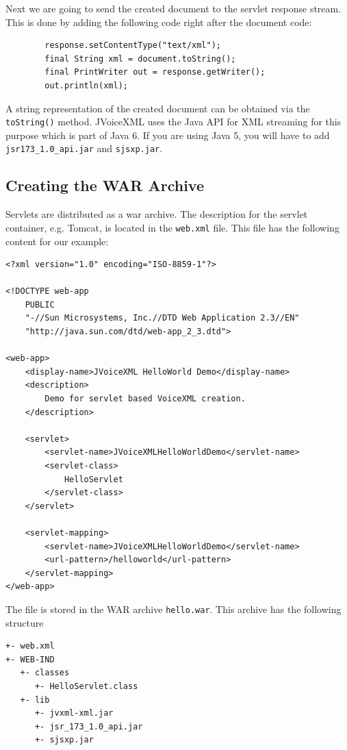 \documentclass[11pt,a4paper]{article}
\begin{document}
Next we are going to send the created document to the servlet response stream.
This is done by adding the following code right after the document code:

\begin{lstlisting}
        response.setContentType("text/xml");
        final String xml = document.toString();
        final PrintWriter out = response.getWriter();
        out.println(xml);
\end{lstlisting}

A string representation of the created document can be obtained via the
\texttt{toString()} method. JVoiceXML uses the Java API for XML streaming for
this purpose which is part of Java 6. If you are using Java 5, you will have to
add \texttt{jsr173\_1.0\_api.jar} and \texttt{sjsxp.jar}.

\subsection{Creating the WAR Archive}

Servlets are distributed as a war archive. The description for the servlet
container, e.g. Tomcat, is located in the \texttt{web.xml} file.
This file has the following content for our example:

\begin{lstlisting}
<?xml version="1.0" encoding="ISO-8859-1"?>

<!DOCTYPE web-app
    PUBLIC
    "-//Sun Microsystems, Inc.//DTD Web Application 2.3//EN"
    "http://java.sun.com/dtd/web-app_2_3.dtd">

<web-app>
    <display-name>JVoiceXML HelloWorld Demo</display-name>
    <description>
        Demo for servlet based VoiceXML creation.
    </description>

    <servlet>
        <servlet-name>JVoiceXMLHelloWorldDemo</servlet-name>
        <servlet-class>
            HelloServlet
        </servlet-class>
    </servlet>

    <servlet-mapping>
        <servlet-name>JVoiceXMLHelloWorldDemo</servlet-name>
        <url-pattern>/helloworld</url-pattern>
    </servlet-mapping>
</web-app>
\end{lstlisting}

The file is stored in the WAR archive \texttt{hello.war}. This archive has the
following structure
\begin{lstlisting}
+- web.xml
+- WEB-IND
   +- classes
      +- HelloServlet.class
   +- lib
      +- jvxml-xml.jar
      +- jsr_173_1.0_api.jar
      +- sjsxp.jar
\end{lstlisting}
\end{document}
